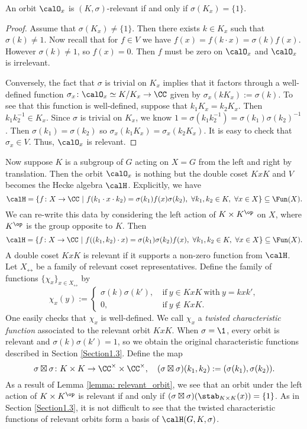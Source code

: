 \begin{lem}\label{lemma: relevant_orbit}
	An orbit $\calO_x$ is $(K,\sigma)$-relevant if and only if $\sigma(K_x) = \{1\}$.
\end{lem}
\begin{proof}
	Assume that $\sigma(K_x)\neq\{1\}$.
	Then there exists $k\in K_x$  such that $\sigma(k)\neq 1$.
	Now recall that for $f\in V$ we have $f(x) = f(k\cdot x) = \sigma(k)f(x)$.
	However $\sigma(k)\neq 1$, so $f(x)=0$.
	Then $f$ must be zero on $\calO_x$ and $\calO_x$ is irrelevant.

	Conversely, the fact that $\sigma$ is trivial on $K_x$ implies that it factors through a well-defined function $\sigma_x\colon \calO_x\simeq K/K_x\rightarrow \CC$ given by $\sigma_x(kK_x) := \sigma(k)$.
	To see that this function is well-defined, suppose that $k_1K_x=k_2K_x$.
	Then $k_1k_2^{-1}\in K_x$.
	Since $\sigma$ is trivial on $K_x$, we know $1=\sigma(k_1k_2^{-1})=\sigma(k_1)\sigma(k_2)^{-1}$.
	Then $\sigma(k_1)=\sigma(k_2)$ so $\sigma_x(k_1K_x) = \sigma_x(k_2K_x)$.
	It is easy to check that $\sigma_x\in V$.
	Thus, $\calO_x$ is relevant.
\end{proof}
Now suppose $K$ is a subgroup of $G$ acting on $X=G$ from the left and right by translation.
Then the orbit $\calO_x$ is nothing but the double coset $KxK$ and $V$ becomes the Hecke algebra $\calH$.
Explicitly, we have
\[
	\calH = \{f\colon X\to\CC \ |\ f(k_1\cdot x \cdot k_2) = \sigma(k_1)f(x)\sigma(k_2),\ \forall k_1,k_2\in K,\ \forall x\in X\}\subseteq \Fun(X).
\]
We can re-write this data by considering the left action of $K\times K^\op$ on $X$, where $K^\op$ is the group opposite to $K$.
Then
\[
	\calH = \{f\colon X\to\CC \ |\ f((k_1,k_2)\cdot x) = \sigma(k_1)\sigma(k_2)f(x),\ \forall k_1,k_2\in K,\ \forall x\in X\}\subseteq\Fun(X).
\]
A double coset $KxK$ is relevant if it supports a non-zero function from $\calH$.
Let $X_\rel$ be a family of relevant coset representatives.
Define the family of functions $\{\chi_x\}_{x\in X_\rel}$ by
\[
	\chi_x(y) := \begin{cases}
		\sigma(k)\sigma(k'),\  & \text{if}\ y\in KxK\ \text{with}\ y=kxk', \\
		0,\                    & \text{if}\ y\notin KxK.
	\end{cases}
\]
One easily checks that $\chi_x$ is well-defined.
We call $\chi_x$ a \emph{twisted characteristic function} associated to the relevant orbit $KxK$.
When $\sigma=\1$, every orbit is relevant and $\sigma(k)\sigma(k')=1$, so we obtain the original characteristic functions described in Section \ref{Section1.3}.
Define the map
\[
	\sigma\boxtimes\sigma\colon K\times K\to\CC^\times\times\CC^\times,\quad (\sigma\boxtimes\sigma)(k_1,k_2) := (\sigma(k_1),\sigma(k_2)).
\]
As a result of Lemma \ref{lemma: relevant_orbit}, we see that an orbit under the left action of $K\times K^\op$ is relevant if and only if $(\sigma\boxtimes\sigma)(\stab_{K\times K}(x)) = \{1\}$.
As in Section \ref{Section1.3}, it is not difficult to see that the twisted characteristic functions of relevant orbits form a basis of $\calH(G,K,\sigma)$.

